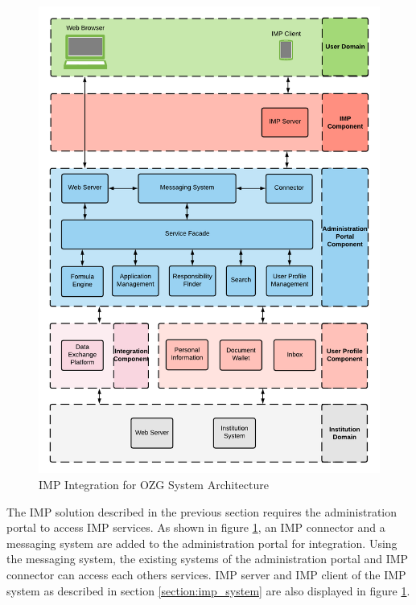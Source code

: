 \begin{figure}[h!]
    \centering
    \includegraphics[scale=0.6]{Diagrams/Integration Architecture 1/Technological Integration/1. Integration Overview.pdf}
    \caption{IMP Integration for OZG System Architecture}
    \label{integration1:integration_overview}
\end{figure}

The IMP solution described in the previous section requires the administration portal to access IMP services. As shown in figure \ref{integration1:integration_overview}, an IMP connector and a messaging system are added to the administration portal for integration. Using the messaging system, the existing systems of the administration portal and IMP connector can access each others services. IMP server and IMP client of the IMP system as described in section \ref{section:imp_system} are also displayed in figure \ref{integration1:integration_overview}.

